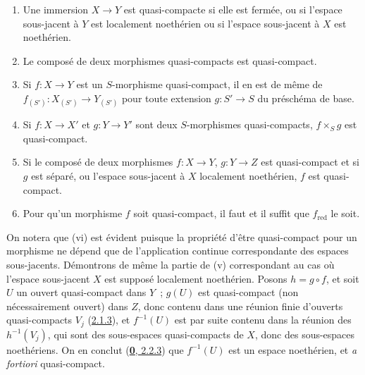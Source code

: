\begin{proposition}[6.6.4]
\label{I.6.6.4-fr}
\begin{enumerate}
  \item[\textup{(i)}] Une immersion $X\to Y$ est quasi-compacte si elle est fermée,
    ou si l'espace sous-jacent à $Y$ est localement noethérien ou si l'espace
    sous-jacent à $X$ est noethérien.
  \item[\textup{(ii)}] Le composé de deux morphismes quasi-compacts est quasi-compact.
  \item[\textup{(iii)}] Si $f:X\to Y$ est un $S$-morphisme quasi-compact, il en est de
    même de $f_{(S')}:X_{(S')}\to Y_{(S')}$ pour toute extension $g:S'\to S$
    du préschéma de base.
  \item[\textup{(iv)}] Si $f:X\to X'$ et $g:Y\to Y'$ sont deux $S$-morphismes
    quasi-compacts, $f\times_S g$ est quasi-compact.
  \item[\textup{(v)}] Si le composé de deux morphismes $f:X\to Y$, $g:Y\to Z$ est
    quasi-compact et si $g$ est séparé, ou l'espace sous-jacent à $X$
    localement noethérien, $f$ est quasi-compact.
  \item[\textup{(vi)}] Pour qu'un morphisme $f$ soit quasi-compact, il faut et il
    suffit que $f_{\mathrm{red}}$ le soit.
\end{enumerate}
\end{proposition}

On notera que (vi) est évident puisque la propriété d'être quasi-compact pour
un morphisme ne dépend que de l'application continue correspondante des
espaces sous-jacents. Démontrons de même la partie de (v) correspondant au cas
où l'espace sous-jacent $X$ est supposé localement noethérien. Posons
$h=g\circ f$, et soit $U$ un ouvert quasi-compact dans $Y$~; $g(U)$ est
quasi-compact (non nécessairement ouvert) dans $Z$, donc contenu dans une
réunion finie d'ouverts quasi-compacts $V_j$
(\hyperref[I.2.1.3-fr]{2.1.3}), et $f^{-1}(U)$ est par suite contenu dans la
réunion des $h^{-1}(V_j)$, qui sont des sous-espaces quasi-compacts de $X$,
donc des sous-espaces noethériens. On en conclut
(\hyperref[0.2.2.3-fr]{\textbf{0}, 2.2.3}) que $f^{-1}(U)$ est un espace noethérien,
et \emph{a fortiori} quasi-compact.

